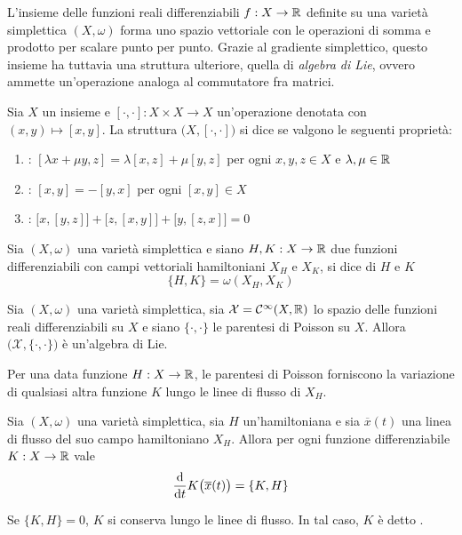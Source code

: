 L'insieme delle funzioni reali differenziabili $f:X \to \mathbb{R}$ definite su una varietà simplettica $(X, \omega)$ forma uno spazio vettoriale con le operazioni di somma e prodotto per scalare punto per punto. Grazie al gradiente simplettico, questo insieme ha tuttavia una struttura ulteriore, quella di \emph{algebra di Lie}, ovvero ammette un'operazione analoga al commutatore fra matrici.
\begin{definition}
  Sia $X$ un insieme e $[\cdot , \cdot]:X \times X \to X$ un'operazione denotata con $(x,y) \mapsto [x,y]$. La struttura $\big(X, [\cdot ,\cdot ]\big)$ si dice  se valgono le seguenti proprietà: \begin{enumerate}
    \item {}: $[\lambda x + \mu y, z] = \lambda [x, z] + \mu[y,z]$ per ogni $x,y,z \in X$ e $\lambda, \mu \in  \mathbb{R}$
    \item {}: $[x,y] = -[y,x]$ per ogni $[x,y] \in X$
    \item {}: $\big[x,[y,z]\big] + \big[z,[x,y]\big] + \big[y,[z,x]\big] = 0$
  \end{enumerate}
\end{definition}

\begin{definition}
  Sia $(X, \omega)$ una varietà simplettica e siano $H,K: X \to \mathbb{R}$ due funzioni differenziabili con campi vettoriali hamiltoniani $X_H$ e $X_K$, si dice  di $H$ e $K$ \begin{equation*}
  \{H,K\} = \omega(X_H,X_K) 
  \end{equation*} 
\end{definition}
\begin{theorem}
  Sia $(X, \omega)$ una varietà simplettica, sia $\mathcal{X} = \mathcal{C}^{\infty}(X,\mathbb{R})$ lo spazio delle funzioni reali differenziabili su $X$ e siano $\{\cdot , \cdot \}$ le parentesi di Poisson su $X$. Allora $\big(\mathcal{X}, \{\cdot , \cdot\}\big)$ è un'algebra di Lie.
\end{theorem}

Per una data funzione $H:X\to \mathbb{R}$, le parentesi di Poisson forniscono la variazione di qualsiasi altra funzione $K$ lungo le linee di flusso di $X_H$.
\begin{theorem}
  Sia $(X, \omega)$ una varietà simplettica, sia $H$ un'hamiltoniana e sia $\overline{x}(t)$ una linea di flusso del suo campo hamiltoniano $X_H$. Allora per ogni funzione differenziabile $K:X\to \mathbb{R}$ vale \begin{equation*}
  \dv{t} K\big(\overline{x}(t)\big) = \{K,H\} 
  \end{equation*}  
\end{theorem}
\begin{corollary}
  Se $\{K, H\} = 0$, $K$ si conserva lungo le linee di flusso. In tal caso, $K$ è detto .
\end{corollary}

